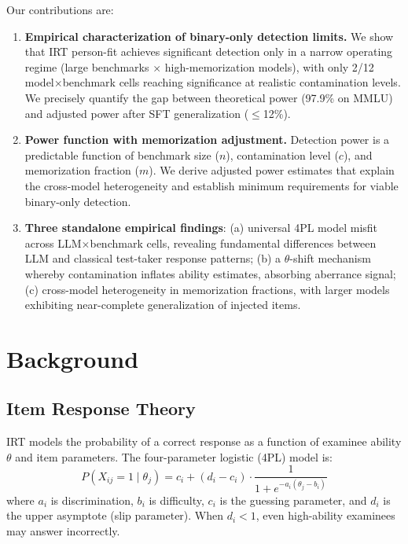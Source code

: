 \documentclass[11pt]{article}
\begin{document}
Our contributions are:
\begin{enumerate}
    \item \textbf{Empirical characterization of binary-only detection limits.} We show that IRT person-fit achieves significant detection only in a narrow operating regime (large benchmarks $\times$ high-memorization models), with only 2/12 model$\times$benchmark cells reaching significance at realistic contamination levels. We precisely quantify the gap between theoretical power (97.9\% on MMLU) and adjusted power after SFT generalization ($\leq$12\%).
    \item \textbf{Power function with memorization adjustment.} Detection power is a predictable function of benchmark size ($n$), contamination level ($c$), and memorization fraction ($m$). We derive adjusted power estimates that explain the cross-model heterogeneity and establish minimum requirements for viable binary-only detection.
    \item \textbf{Three standalone empirical findings}: (a) universal 4PL model misfit across LLM$\times$benchmark cells, revealing fundamental differences between LLM and classical test-taker response patterns; (b) a $\theta$-shift mechanism whereby contamination inflates ability estimates, absorbing aberrance signal; (c) cross-model heterogeneity in memorization fractions, with larger models exhibiting near-complete generalization of injected items.
\end{enumerate}

\section{Background}
\label{sec:background}

\subsection{Item Response Theory}

IRT models the probability of a correct response as a function of examinee ability $\theta$ and item parameters. The four-parameter logistic (4PL) model is:
\begin{equation}
P(X_{ij}=1 \mid \theta_j) = c_i + (d_i - c_i) \cdot \frac{1}{1 + e^{-a_i(\theta_j - b_i)}}
\end{equation}
where $a_i$ is discrimination, $b_i$ is difficulty, $c_i$ is the guessing parameter, and $d_i$ is the upper asymptote (slip parameter). When $d_i < 1$, even high-ability examinees may answer incorrectly.
\end{document}
